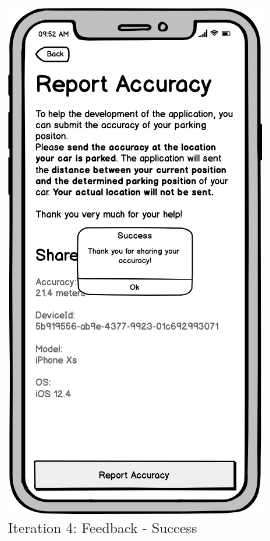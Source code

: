 \begin{figure}[H]
  \centering
  \begin{minipage}[b]{0.45\textwidth}
    \centering
    \includegraphics[width=0.6\textwidth]{images/UI/Iteration4-Feedback-Success.png}
    \caption{Iteration 4: Feedback - Success}
    \label{fig:i4-feedback-succ}
  \end{minipage}
  \hfill
  \begin{minipage}[b]{0.45\textwidth}
    
  \end{minipage}
\end{figure}